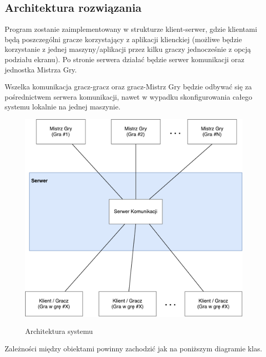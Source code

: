 \documentclass[11pt]{article}
\let\Oldsubsection\subsection
\renewcommand{\subsection}{\FloatBarrier\Oldsubsection}
\begin{document}
\subsection{Architektura rozwiązania}
\par
Program zostanie zaimplementowany w strukturze klient-serwer, gdzie klientami będą poszczególni gracze korzystający z aplikacji klienckiej (możliwe będzie korzystanie z jednej maszyny/aplikacji przez kilku graczy jednocześnie z opcją podziału ekranu). Po stronie serwera działać będzie serwer komunikacji oraz jednostka Mistrza Gry.
\par
Wszelka komunikacja gracz-gracz oraz gracz-Mistrz Gry będzie odbywać się za pośrednictwem serwera komunikacji, nawet w wypadku skonfigurowania całego systemu lokalnie na jednej maszynie.

\begin{figure}[!h]
\caption{Architektura systemu}
\resizebox{\textwidth}{!}
{
\includegraphics{../res/architecture}
}
\end{figure}
\FloatBarrier

\par
Zależności między obiektami powinny zachodzić jak na poniższym diagramie klas.
\end{document}
